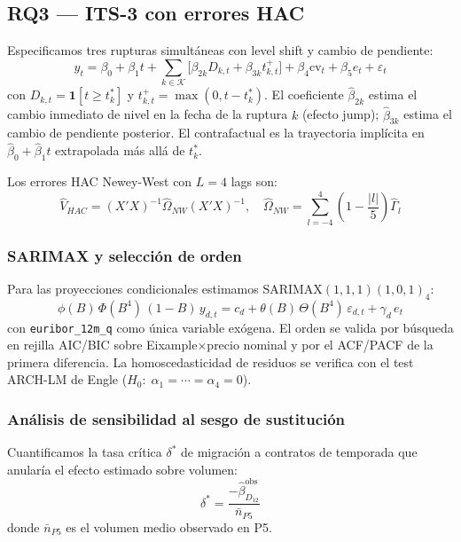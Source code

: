 \documentclass[10pt,a4paper,twocolumn]{article}
\begin{document}
\subsection{RQ3 — ITS-3 con errores HAC}

Especificamos tres rupturas simultáneas con level shift y cambio de pendiente:
\begin{equation}
  y_t = \beta_0 + \beta_1 t
  + \sum_{k \in \mathcal{K}}\!\bigl[\beta_{2k} D_{k,t}
    + \beta_{3k} t_{k,t}^+\bigr]
  + \beta_4\text{cv}_t + \beta_5 e_t + \varepsilon_t
  \label{eq:its3}
\end{equation}
con $D_{k,t}{=}\mathbf{1}[t{\geq}t_k^*]$ y $t_{k,t}^+{=}\max(0,t{-}t_k^*)$.
El coeficiente $\hat\beta_{2k}$ estima el cambio inmediato de nivel en la fecha
de la ruptura $k$ (efecto jump); $\hat\beta_{3k}$ estima el cambio de pendiente
posterior. El contrafactual es la trayectoria implícita en $\hat\beta_0 + \hat\beta_1 t$
extrapolada más allá de $t_k^*$.

Los errores HAC Newey-West con $L{=}4$ lags son:
\begin{equation}
  \hat{V}_{HAC} = (X'X)^{-1}\hat{\Omega}_{NW}(X'X)^{-1}, \quad
  \hat{\Omega}_{NW} = \sum_{l=-4}^4\!\left(1-\frac{|l|}{5}\right)\!\hat\Gamma_l
  \label{eq:hac}
\end{equation}

\subsubsection{SARIMAX y selección de orden}

Para las proyecciones condicionales estimamos SARIMAX$(1,1,1)(1,0,1)_4$:
\begin{equation}
  \phi(B)\,\Phi(B^4)\,(1{-}B)\,y_{d,t}
  = c_d + \theta(B)\,\Theta(B^4)\,\varepsilon_{d,t} + \gamma_d\,e_t
  \label{eq:sarimax}
\end{equation}
con \texttt{euribor\_12m\_q} como única variable exógena. El orden se valida
por búsqueda en rejilla AIC/BIC sobre Eixample$\times$precio nominal y por
el ACF/PACF de la primera diferencia. La homoscedasticidad de residuos se
verifica con el test ARCH-LM de Engle ($H_0{:}\;\alpha_1{=}\cdots{=}\alpha_4{=}0$).

\subsubsection{Análisis de sensibilidad al sesgo de sustitución}

Cuantificamos la tasa crítica $\delta^*$ de migración a contratos de temporada
que anularía el efecto estimado sobre volumen:
\begin{equation}
  \delta^* = \frac{-\hat\beta_{D_{12}}^{\text{obs}}}{\bar{n}_{P5}}
  \label{eq:indif}
\end{equation}
donde $\bar{n}_{P5}$ es el volumen medio observado en P5.
\end{document}
